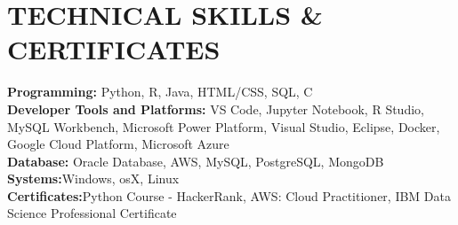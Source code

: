 \documentclass[letterpaper,11pt]{article}
\begin{document}
\section{TECHNICAL SKILLS \& CERTIFICATES}
 \begin{itemize}[leftmargin=0.15in, label={}]
    \small{\item{
     \textbf{\normalsize{Programming:}}{ \normalsize{Python, R, Java, HTML/CSS, SQL, C}}\\
     \textbf{\normalsize{Developer Tools and Platforms:}}{ \normalsize{VS Code, Jupyter Notebook, R Studio, MySQL Workbench, Microsoft Power Platform, Visual Studio, Eclipse, Docker, Google Cloud Platform, Microsoft Azure}} \\
     \textbf{\normalsize{Database:}}{ \normalsize{Oracle Database, AWS, MySQL, PostgreSQL, MongoDB}}\\
     \textbf{\normalsize{Systems:}}{\normalsize{Windows, osX, Linux}} \\
     \textbf{\normalsize{Certificates:}}{\normalsize{Python Course - HackerRank, AWS: Cloud Practitioner, IBM Data Science Professional Certificate}} \\
    }}
 \end{itemize}
 \vspace{-10pt}
\end{document}
